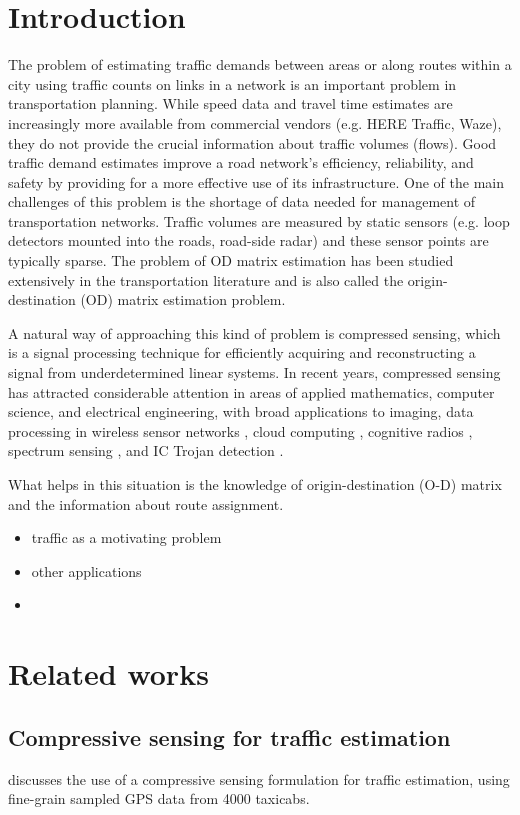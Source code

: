 \documentclass{article} %
\begin{document}
\section{Introduction}
The problem of estimating traffic demands between areas or along routes within a city using traffic counts on links in a network is an important problem in transportation planning. While speed data and travel time estimates are increasingly more available from commercial vendors (e.g. HERE Traffic, Waze), they do not provide the crucial information about traffic volumes (flows). Good traffic demand estimates improve a road network's efficiency, reliability, and safety by providing for a more effective use of its infrastructure. One of the main challenges of this problem is the shortage of data needed for management of transportation networks. Traffic volumes are measured by static sensors (e.g. loop detectors mounted into the roads, road-side radar) and these sensor points are typically sparse. The problem of OD matrix estimation has been studied extensively in the transportation literature and is also called the origin-destination (OD) matrix estimation problem. 

A natural way of approaching this kind of problem is compressed sensing, which is a signal processing technique for efficiently acquiring and reconstructing a signal from underdetermined linear systems. In recent years, compressed sensing has attracted considerable attention in areas of applied mathematics, computer science, and electrical engineering, with broad applications to imaging, data processing in wireless sensor networks \cite{luo2009compressive}, cloud computing \cite{kung2011cloudsense}, cognitive radios \cite{tian2007compressed}, spectrum sensing \cite{polo2009compressive}, and IC Trojan detection \cite{gwon2012statistical}.

What helps in this situation is the knowledge of origin-destination (O-D) matrix and the information about route assignment.


\begin{itemize}
\item traffic as a motivating problem
\item other applications
\item 
\end{itemize}

\section{Related works}
\subsection{Compressive sensing for traffic estimation}
\cite{6319305} discusses the use of a compressive sensing formulation for traffic estimation, using fine-grain sampled GPS data from 4000 taxicabs. 
\end{document}
